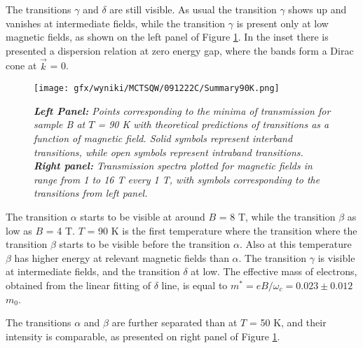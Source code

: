 \documentclass[titlepage,a4paper]{book}
\begin{document}
The transitions $\gamma$ and $\delta$ are still visible. As usual the transition $\gamma$ shows up and vanishes at intermediate fields, while the transition $\gamma$ is present only at low magnetic fields, as shown on the left panel of Figure \ref{fig:Summary_SQW_90K}. In the inset there is presented a dispersion relation at zero energy gap, where the bands form a Dirac cone at $\vec{k}$ = 0. 
\begin{figure}[ht]
	\centering
	\texttt{[image: gfx/wyniki/MCTSQW/091222C/Summary90K.png]}
	\vspace{-10pt}
	\caption{\textit{\textbf{Left Panel:} Points corresponding to the minima of transmission for sample B at $T$ = 90 K with theoretical predictions of transitions as a function of magnetic field. Solid symbols represent interband transitions, while open symbols represent intraband transitions. \textbf{Right panel:} Transmission spectra plotted for magnetic fields in range from 1 to 16 T every 1 T, with symbols corresponding to the transitions from left panel.}}
	\label{fig:Summary_SQW_90K}
\end{figure}
The transition $\alpha$ starts to be visible at around $B$ = 8 T, while the transition $\beta$ as low as $B$ = 4 T. $T$ = 90 K is the first temperature where the transition where the transition $\beta$ starts to be visible before the transition $\alpha$. Also at this temperature $\beta$ has higher energy at relevant magnetic fields than $\alpha$. The transition $\gamma$ is visible at intermediate fields, and the transition $\delta$ at low. The effective mass of electrons, obtained from the linear fitting of $\delta$ line, is equal to $m^* = eB/\omega_c = 0.023 \pm 0.012$ $m_0$. 

The transitions $\alpha$ and $\beta$ are further separated than at $T$ = 50 K, and their intensity is comparable, as presented on right panel of Figure \ref{fig:Summary_SQW_90K}.
\end{document}
